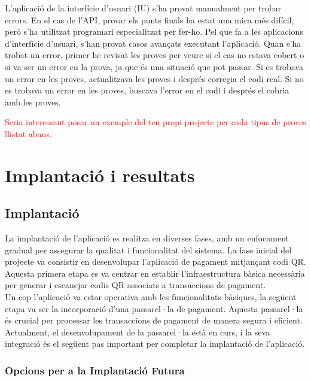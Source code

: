 \documentclass[a4paper,12pt,twoside]{ThesisStyle}
\newcommand{\pau}[1]{\textcolor{red}{#1}}
\begin{document}
L'aplicació de la interfície d'usuari (IU) s'ha provat manualment per trobar errors. En el cas de l'API, provar els punts finals ha estat una mica més difícil, però s'ha utilitzat programari especialitzat per fer-ho. Pel que fa a les aplicacions d'interfície d'usuari, s'han provat casos avançats executant l'aplicació. Quan s'ha trobat un error, primer he revisat les proves per veure si el cas no estava cobert o si va ser un error en la prova, ja que és una situació que pot passar. Si es trobava un error en les proves, actualitzava les proves i després corregia el codi real. Si no es trobava un error en les proves, buscava l'error en el codi i després el cobria amb les proves.

\pau{Seria interessant posar un exemple del teu propi projecte per cada tipus de proves llistat abans.}




\chapter{Implantació i resultats}
\label{chp:implantacio}


\section{Implantació}
\label{sec: Implantació}


La implantació de l'aplicació es realitza en diverses fases, amb un enfocament gradual per assegurar la qualitat i funcionalitat del sistema. La fase inicial del projecte va consistir en desenvolupar l'aplicació de pagament mitjançant codi QR. Aquesta primera etapa es va centrar en establir l'infraestructura bàsica necessària per generar i escanejar codis QR associats a transaccions de pagament.\\

Un cop l'aplicació va estar operativa amb les funcionalitats bàsiques, la següent etapa va ser la incorporació d'una passarel·la de pagament. Aquesta passarel·la és crucial per processar les transaccions de pagament de manera segura i eficient. Actualment, el desenvolupament de la passarel·la està en curs, i la seva integració és el següent pas important per completar la implantació de l'aplicació.\\



\subsection{Opcions per a la Implantació Futura}
\end{document}
